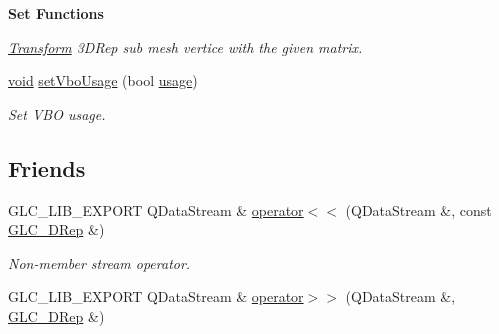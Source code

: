 \begin{Indent}{\bf Set Functions}
\begin{DoxyCompactItemize}
\begin{DoxyCompactList}\small\item\em \hyperlink{class_transform}{Transform} 3\-D\-Rep sub mesh vertice with the given matrix. \end{DoxyCompactList}\item 
\hyperlink{group___u_a_v_objects_plugin_ga444cf2ff3f0ecbe028adce838d373f5c}{void} \hyperlink{class_g_l_c__3_d_rep_a4de971dc186a782e78750c05dd8d7a81}{set\-Vbo\-Usage} (bool \hyperlink{glext_8h_ae759ed0394ed5353d8bef2fb755305da}{usage})
\begin{DoxyCompactList}\small\item\em Set V\-B\-O usage. \end{DoxyCompactList}\end{DoxyCompactItemize}
\end{Indent}
\subsection*{Friends}
\begin{DoxyCompactItemize}
\item 
G\-L\-C\-\_\-\-L\-I\-B\-\_\-\-E\-X\-P\-O\-R\-T Q\-Data\-Stream \& \hyperlink{class_g_l_c__3_d_rep_a8c144ca426be8268672835e70c06663e}{operator$<$$<$} (Q\-Data\-Stream \&, const \hyperlink{class_g_l_c__3_d_rep}{G\-L\-C\-\_\-D\-Rep} \&)
\begin{DoxyCompactList}\small\item\em Non-\/member stream operator. \end{DoxyCompactList}\item 
G\-L\-C\-\_\-\-L\-I\-B\-\_\-\-E\-X\-P\-O\-R\-T Q\-Data\-Stream \& \hyperlink{class_g_l_c__3_d_rep_a060c8733575693100a5ad6496098ffa4}{operator$>$$>$} (Q\-Data\-Stream \&, \hyperlink{class_g_l_c__3_d_rep}{G\-L\-C\-\_\-D\-Rep} \&)
\end{DoxyCompactItemize}
